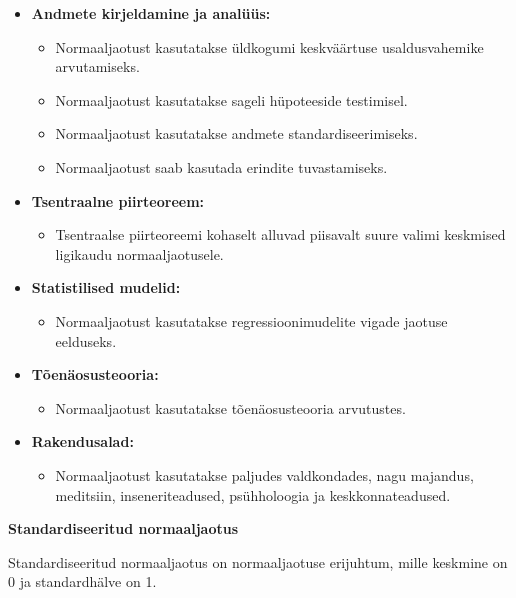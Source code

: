 \documentclass[
]{book}
\providecommand{\tightlist}{%
  \setlength{\itemsep}{0pt}\setlength{\parskip}{0pt}}
\begin{document}
\begin{itemize}
\tightlist
\item
  \textbf{Andmete kirjeldamine ja analüüs:}

  \begin{itemize}
  \tightlist
  \item
    Normaaljaotust kasutatakse üldkogumi keskväärtuse usaldusvahemike arvutamiseks.
  \item
    Normaaljaotust kasutatakse sageli hüpoteeside testimisel.
  \item
    Normaaljaotust kasutatakse andmete standardiseerimiseks.
  \item
    Normaaljaotust saab kasutada erindite tuvastamiseks.
  \end{itemize}
\item
  \textbf{Tsentraalne piirteoreem:}

  \begin{itemize}
  \tightlist
  \item
    Tsentraalse piirteoreemi kohaselt alluvad piisavalt suure valimi keskmised ligikaudu normaaljaotusele.
  \end{itemize}
\item
  \textbf{Statistilised mudelid:}

  \begin{itemize}
  \tightlist
  \item
    Normaaljaotust kasutatakse regressioonimudelite vigade jaotuse eelduseks.
  \end{itemize}
\item
  \textbf{Tõenäosusteooria:}

  \begin{itemize}
  \tightlist
  \item
    Normaaljaotust kasutatakse tõenäosusteooria arvutustes.
  \end{itemize}
\item
  \textbf{Rakendusalad:}

  \begin{itemize}
  \tightlist
  \item
    Normaaljaotust kasutatakse paljudes valdkondades, nagu majandus, meditsiin, inseneriteadused, psühholoogia ja keskkonnateadused.
  \end{itemize}
\end{itemize}

\textbf{Standardiseeritud normaaljaotus}

Standardiseeritud normaaljaotus on normaaljaotuse erijuhtum, mille keskmine on 0 ja standardhälve on 1.
\end{document}
